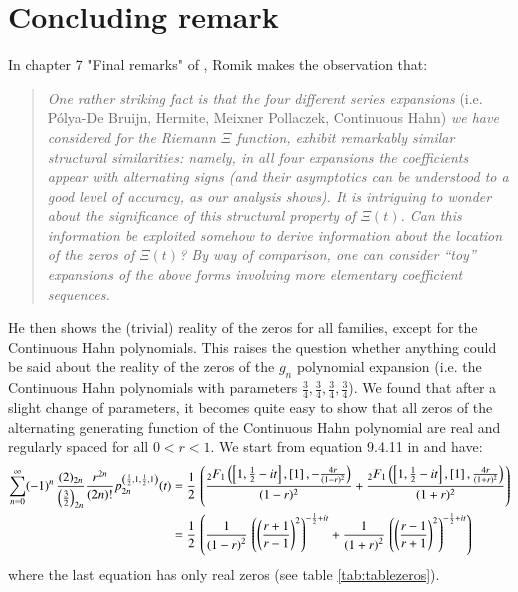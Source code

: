 \documentclass[a4paper,11pt,twoside]{amsart}
\newcommand{\verifiedeq}{=}
\newcommand{\verifiedeq}{\stackrel{\checkmark}{=}}
\begin{document}
\section{Concluding remark}\label{concremarks}
 
In chapter 7 "Final remarks" of \cite{rom}, Romik makes the observation that:
\begin{quotation}
\textit{One rather striking fact is that the four different series expansions} (i.e. Pólya-De Bruijn, Hermite, Meixner Pollaczek, Continuous Hahn) \textit{we have considered for the Riemann $\Xi$ function, exhibit remarkably similar structural similarities: namely, in all four expansions the coefficients appear with alternating signs (and their asymptotics can be understood to a good level of accuracy, as our analysis shows). It is intriguing to wonder about the significance of this structural property of $\Xi(t)$. Can this information be exploited somehow to derive information about the location of the zeros of $\Xi(t)$? By way of comparison, one can consider “toy” expansions of the above forms involving more elementary coefficient sequences.}
\end{quotation}

He then shows the (trivial) reality of the zeros for all families, except for the Continuous Hahn polynomials. This raises the question whether anything could be said about the reality of the zeros of the $g_n$ polynomial expansion (i.e. the Continuous Hahn polynomials with parameters $\frac34, \frac34, \frac34, \frac34$). We found that after a slight change of parameters, it becomes quite easy to show that all zeros of the alternating generating function of the Continuous Hahn polynomial are real and regularly spaced for all $0 < r < 1$. We start from equation 9.4.11 in \cite{koe} and have:
\begin{align}
\sum_{n=0}^\infty (-1)^n\, \frac{(2)_{2n}}{\left(\frac32\right)_{2n}}\frac{ r^{2n}}{(2n)!}p_{2n}^{\left(\frac12,1,\frac12,1\right)}(t) &\verifiedeq \frac12\,\left(\frac{{}_2F_1\left(\left[1,\frac12-it\right],\left[1\right], -\frac{4r}{(1-r)^2}\right)}{(1-r)^2}+\frac{{}_2F_1\left(\left[1,\frac12-it\right],\left[1\right], \frac{4r}{(1+r)^2}\right)}{(1+r)^2} \right) \\
 & \verifiedeq \frac12\, \left(\frac{1}{\left(1-r \right)^{2}}\,\left(\left(\dfrac{r+1}{r -1}\right)^{2}\right)^{-\frac{1}{2}+it}+\frac{1}{{\left(1+r \right)^{2}}}\,\left(\left(\dfrac{r -1}{r+1}\right)^{2}\right)^{-\frac{1}{2}+it}\right) \notag
\end{align}
where the last equation has only real zeros (see table \ref{tab:tablezeros}).
\end{document}

